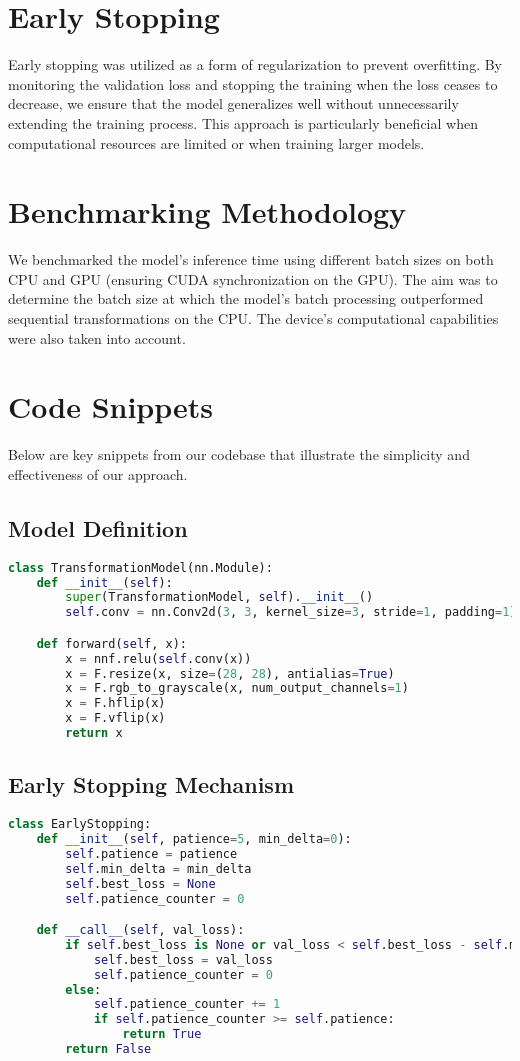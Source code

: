 \documentclass[12pt, a4paper]{article}
\begin{document}
\section{Early Stopping}
Early stopping was utilized as a form of regularization to prevent overfitting. By monitoring the validation loss and stopping the training when the loss ceases to decrease, we ensure that the model generalizes well without unnecessarily extending the training process. This approach is particularly beneficial when computational resources are limited or when training larger models.

\section{Benchmarking Methodology}
We benchmarked the model's inference time using different batch sizes on both CPU and GPU (ensuring CUDA synchronization on the GPU). The aim was to determine the batch size at which the model's batch processing outperformed sequential transformations on the CPU. The device's computational capabilities were also taken into account.

\section{Code Snippets}
Below are key snippets from our codebase that illustrate the simplicity and effectiveness of our approach.

\subsection{Model Definition}
\begin{lstlisting}[language=Python, caption=TransformationModel definition]
class TransformationModel(nn.Module):
    def __init__(self):
        super(TransformationModel, self).__init__()
        self.conv = nn.Conv2d(3, 3, kernel_size=3, stride=1, padding=1)

    def forward(self, x):
        x = nnf.relu(self.conv(x))
        x = F.resize(x, size=(28, 28), antialias=True)
        x = F.rgb_to_grayscale(x, num_output_channels=1)
        x = F.hflip(x)
        x = F.vflip(x)
        return x
\end{lstlisting}

\subsection{Early Stopping Mechanism}
\begin{lstlisting}[language=Python, caption=EarlyStopping class]
class EarlyStopping:
    def __init__(self, patience=5, min_delta=0):
        self.patience = patience
        self.min_delta = min_delta
        self.best_loss = None
        self.patience_counter = 0

    def __call__(self, val_loss):
        if self.best_loss is None or val_loss < self.best_loss - self.min_delta:
            self.best_loss = val_loss
            self.patience_counter = 0
        else:
            self.patience_counter += 1
            if self.patience_counter >= self.patience:
                return True
        return False
\end{lstlisting}
\end{document}
